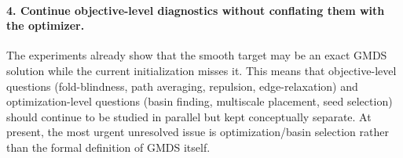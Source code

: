 \documentclass[twoside,11pt]{article}
\begin{document}
\paragraph{4. Continue objective-level diagnostics without conflating them with
the optimizer.}
The experiments already show that the smooth target may be an exact GMDS
solution while the current initialization misses it.  This means that
objective-level questions (fold-blindness, path averaging, repulsion,
edge-relaxation) and optimization-level questions (basin finding, multiscale
placement, seed selection) should continue to be studied in parallel but kept
conceptually separate.  At present, the most urgent unresolved issue is
optimization/basin selection rather than the formal definition of GMDS itself.




\end{document}
